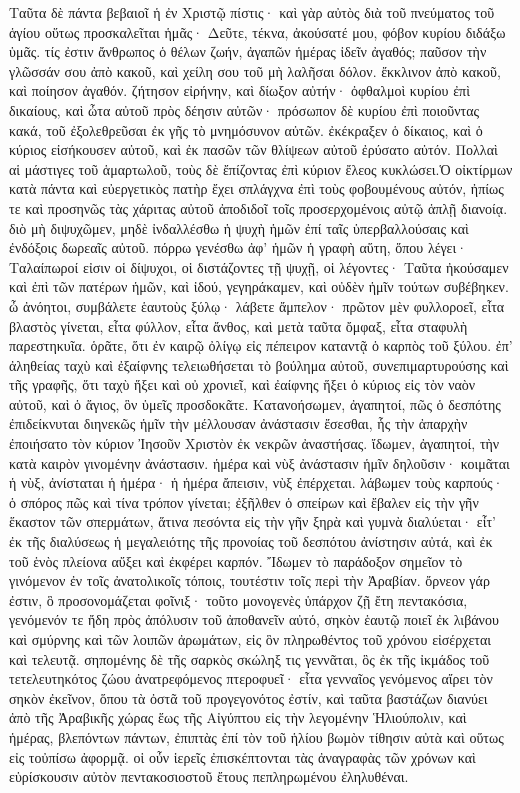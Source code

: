 Ταῦτα δὲ πάντα βεβαιοῖ ἡ ἐν Χριστῷ πίστις· καὶ γὰρ αὐτὸς διὰ τοῦ πνεύματος τοῦ ἁγίου οὕτως προσκαλεῖται ἡμᾶς· Δεῦτε, τέκνα, ἀκούσατέ μου, φόβον κυρίου διδάξω ὑμᾶς. τίς ἐστιν ἄνθρωπος ὁ θέλων ζωήν, ἀγαπῶν ἡμέρας ἰδεῖν ἀγαθός; παῦσον τὴν γλῶσσάν σου ἀπὸ κακοῦ, καὶ χείλη σου τοῦ μὴ λαλῆσαι δόλον. ἔκκλινον ἀπὸ κακοῦ, καὶ ποίησον ἀγαθόν. ζήτησον εἰρήνην, καὶ δίωξον αὐτήν· ὀφθαλμοὶ κυρίου ἐπὶ δικαίους, καὶ ὦτα αὐτοῦ πρὸς δέησιν αὐτῶν· πρόσωπον δὲ κυρίου ἐπὶ ποιοῦντας κακά, τοῦ ἐξολεθρεῦσαι ἐκ γῆς τὸ μνημόσυνον αὐτῶν. ἐκέκραξεν ὁ δίκαιος, καὶ ὁ κύριος εἰσήκουσεν αὐτοῦ, καὶ ἐκ πασῶν τῶν θλίψεων αὐτοῦ ἐρύσατο αὐτόν. Πολλαὶ αἱ μάστιγες τοῦ ἁμαρτωλοῦ, τοὺς δὲ ἔπίζοντας ἐπὶ κύριον ἔλεος κυκλώσει.Ὁ οἰκτίρμων κατὰ πάντα καὶ εὐεργετικὸς πατὴρ ἔχει σπλάγχνα ἐπὶ τοὺς φοβουμένους αὐτόν, ἠπίως τε καὶ προσηνῶς τὰς χάριτας αὐτοῦ ἀποδιδοῖ τοῖς προσερχομένοις αὐτῷ ἁπλῇ διανοίᾳ. διὸ μὴ διψυχῶμεν, μηδὲ ἰνδαλλέσθω ἡ ψυχὴ ἡμῶν ἐπί ταῖς ὑπερβαλλούσαις καὶ ἐνδόξοις δωρεαῖς αὐτοῦ. πόρρω γενέσθω ἀφ’ ἡμῶν ἡ γραφὴ αὕτη, ὅπου λέγει· Ταλαίπωροί εἰσιν οἱ δίψυχοι, οἱ διστάζοντες τῇ ψυχῇ, οἱ λέγοντες· Ταῦτα ἠκούσαμεν καὶ ἐπὶ τῶν πατέρων ἡμῶν, καὶ ἰδού, γεγηράκαμεν, καὶ οὐδὲν ἡμῖν τούτων συβέβηκεν. ὦ ἀνόητοι, συμβάλετε ἑαυτοὺς ξύλῳ· λάβετε ἄμπελον· πρῶτον μὲν φυλλοροεῖ, εἶτα βλαστὸς γίνεται, εἶτα φύλλον, εἶτα ἄνθος, καὶ μετὰ ταῦτα ὄμφαξ, εἶτα σταφυλὴ παρεστηκυῖα. ὁρᾶτε, ὅτι ἐν καιρῷ ὀλίγῳ εἰς πέπειρον καταντᾷ ὁ καρπὸς τοῦ ξύλου. ἐπ’ ἀληθείας ταχὺ καὶ ἐξαίφνης τελειωθήσεται τὸ βούλημα αὐτοῦ, συνεπιμαρτυρούσης καὶ τῆς γραφῆς, ὅτι ταχὺ ἥξει καὶ οὐ χρονιεῖ, καὶ ἐαίφνης ἥξει ὁ κύριος εἰς τὸν ναὸν αὐτοῦ, καὶ ὁ ἅγιος, ὃν ὑμεῖς προσδοκᾶτε. 
Κατανοήσωμεν, ἀγαπητοί, πῶς ὁ δεσπότης ἐπιδείκνυται διηνεκῶς ἡμῖν τὴν μέλλουσαν ἀνάστασιν ἔσεσθαι, ἧς τὴν ἀπαρχὴν ἐποιήσατο τὸν κύριον Ἰησοῦν Χριστὸν ἐκ νεκρῶν ἀναστήσας. ἴδωμεν, ἀγαπητοί, τὴν κατὰ καιρὸν γινομένην ἀνάστασιν. ἡμέρα καὶ νὺξ ἀνάστασιν ἡμῖν δηλοῦσιν· κοιμᾶται ἡ νὺξ, ἀνίσταται ἡ ἡμέρα· ἡ ἡμέρα ἄπεισιν, νὺξ ἐπέρχεται. λάβωμεν τοὺς καρπούς· ὁ σπόρος πῶς καὶ τίνα τρόπον γίνεται; ἐξῆλθεν ὁ σπείρων καὶ ἔβαλεν εἰς τὴν γῆν ἕκαστον τῶν σπερμάτων, ἅτινα πεσόντα εἰς τὴν γῆν ξηρὰ καὶ γυμνὰ διαλύεται· εἶτ’ ἐκ τῆς διαλύσεως ἡ μεγαλειότης τῆς προνοίας τοῦ δεσπότου ἀνίστησιν αὐτά, καὶ ἐκ τοῦ ἑνὸς πλείονα αὔξει καὶ ἐκφέρει καρπόν. 
Ἴδωμεν τὸ παράδοξον σημεῖον τὸ γινόμενον ἐν τοῖς ἀνατολικοῖς τόποις, τουτέστιν τοῖς περὶ τὴν Ἀραβίαν. ὄρνεον γάρ ἐστιν, ὃ προσονομάζεται φοῖνιξ· τοῦτο μονογενὲς ὑπάρχον ζῇ ἔτη πεντακόσια, γενόμενόν τε ἤδη πρὸς ἀπόλυσιν τοῦ ἀποθανεῖν αὐτό, σηκὸν ἑαυτῷ ποιεῖ ἐκ λιβάνου καὶ σμύρνης καὶ τῶν λοιπῶν ἀρωμάτων, εἰς ὃν πληρωθέντος τοῦ χρόνου εἰσέρχεται καὶ τελευτᾷ. σηπομένης δὲ τῆς σαρκὸς σκώληξ τις γεννᾶται, ὃς ἐκ τῆς ἰκμάδος τοῦ τετελευτηκότος ζώου ἀνατρεφόμενος πτεροφυεῖ· εἶτα γενναῖος γενόμενος αἴρει τὸν σηκὸν ἐκεῖνον, ὅπου τὰ ὀστᾶ τοῦ προγεγονότος ἐστίν, καὶ ταῦτα βαστάζων διανύει ἀπὸ τῆς Ἀραβικῆς χώρας ἕως τῆς Αἰγύπτου εἰς τὴν λεγομένην Ἡλιούπολιν, καὶ ἡμέρας, βλεπόντων πάντων, ἐπιπτὰς ἐπί τὸν τοῦ ἡλίου βωμὸν τίθησιν αὐτὰ καὶ οὕτως εἰς τοὐπίσω ἀφορμᾷ. οἱ οὖν ἱερεῖς ἐπισκέπτονται τὰς ἀναγραφὰς τῶν χρόνων καὶ εὑρίσκουσιν αὐτὸν πεντακοσιοστοῦ ἔτους πεπληρωμένου ἐληλυθέναι.
